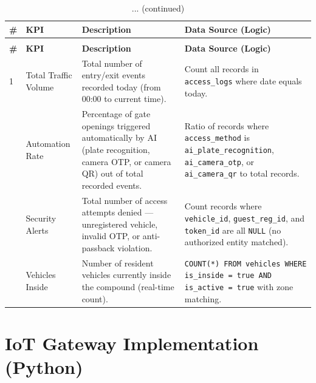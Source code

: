 \documentclass[a4paper]{article}
\begin{document}
\begin{longtable}{@{}
    >{\centering\arraybackslash}p{}
    >{\raggedright\arraybackslash}p{}
    p{}
    >{\raggedright\arraybackslash}p{} @{}}

    \caption{Manager Dashboard KPIs}
    \label{tab:manager_kpis} \\

    \toprule
    \textbf{\#} & \textbf{KPI} & \textbf{Description} & \textbf{Data Source (Logic)} \\
    \midrule
    \endfirsthead

    \caption[]{... (continued)} \\
    \toprule
    \textbf{\#} & \textbf{KPI} & \textbf{Description} & \textbf{Data Source (Logic)} \\
    \midrule
    \endhead

    \bottomrule
    \endlastfoot

    1 & Total Traffic Volume & Total number of entry/exit events recorded today (from 00:00 to current time). & Count all records in \texttt{access\_logs} where date equals today. \\
    \addlinespace
    2 & Automation Rate & Percentage of gate openings triggered automatically by AI (plate recognition, camera OTP, or camera QR) out of total recorded events. & Ratio of records where \texttt{access\_method} is \texttt{ai\_plate\_recognition}, \texttt{ai\_camera\_otp}, or \texttt{ai\_camera\_qr} to total records. \\
    \addlinespace
    3 & Security Alerts & Total number of access attempts denied — unregistered vehicle, invalid OTP, or anti-passback violation. & Count records where \texttt{vehicle\_id}, \texttt{guest\_reg\_id}, and \texttt{token\_id} are all \texttt{NULL} (no authorized entity matched). \\
    \addlinespace
    4 & Vehicles Inside & Number of resident vehicles currently inside the compound (real-time count). & \texttt{COUNT(*) FROM vehicles WHERE is\_inside = true AND is\_active = true} with zone matching. \\
\end{longtable}

\newpage
\section{IoT Gateway Implementation (Python)}
\end{document}
